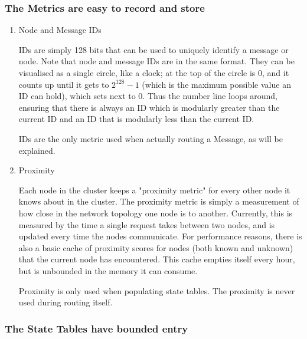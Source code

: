 \documentclass[acmlarge]{acmart}
\begin{document}
\subsubsection{The Metrics are easy to record and store}
\begin{enumerate}
  \item Node and Message IDs

        IDs are simply 128 bits that can be used to uniquely identify a message or node. Note that node and message IDs are in the same format. They can be visualised as a single circle, like a clock; at the top of the circle is 0, and it counts up until it gets to $2^{128}-1$ (which is the maximum possible value an ID can hold), which sets next to 0. Thus the number line loops around, ensuring that there is always an ID which is modularly greater than the current ID and an ID that is modularly less than the current ID.

        IDs are the only metric used when actually routing a Message, as will be explained.

  \item Proximity

        Each node in the cluster keeps a "proximity metric" for every other node it knows about in the cluster. The proximity metric is simply a measurement of how close in the network topology one node is to another. Currently, this is measured by the time a single request takes between two nodes, and is updated every time the nodes communicate. For performance reasons, there is also a basic cache of proximity scores for nodes (both known and unknown) that the current node has encountered. This cache empties itself every hour, but is unbounded in the memory it can consume.

        Proximity is only used when populating state tables. The proximity is never used during routing itself.
\end{enumerate}
\subsubsection{The State Tables have bounded entry}
\end{document}
